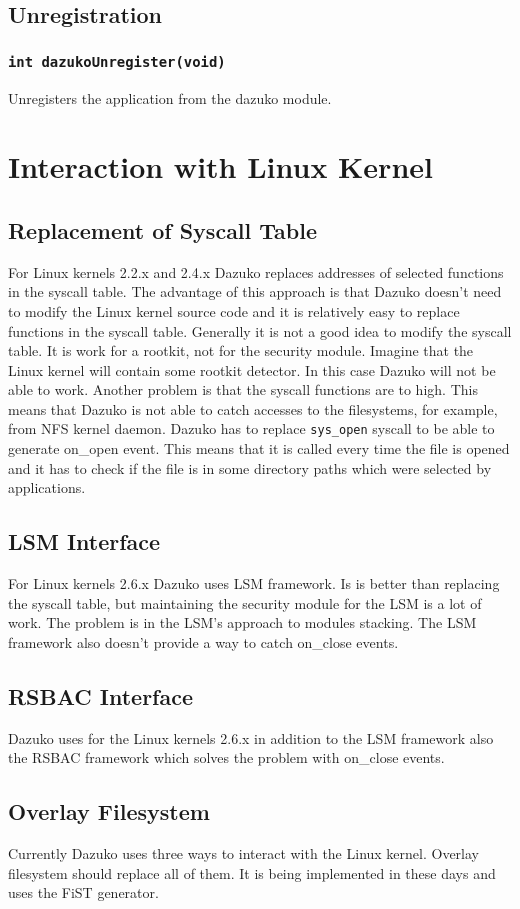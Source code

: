 \subsection*{Unregistration}
\subsubsection{\texttt{int dazukoUnregister(void)}}
Unregisters the application from the dazuko module.


\section{Interaction with Linux Kernel}

\subsection{Replacement of Syscall Table}
For Linux kernels 2.2.x and 2.4.x Dazuko replaces addresses of selected functions in
the syscall table. The advantage of this approach is that Dazuko doesn't need to modify
the Linux kernel source code and it is relatively easy to replace functions in the syscall
table. Generally it is not a good idea to modify the syscall table. It is work
for a 
rootkit, not for the security module. Imagine that the Linux kernel will contain some rootkit
detector. In this case Dazuko will not be able to work. Another problem is that
the syscall
functions are to high. This means that Dazuko is not able to catch accesses to the
filesystems, for example, from NFS kernel daemon. Dazuko has to replace
\texttt{sys\_open} syscall to be able to generate on\_open event. This means that
it is called every time the file is opened and it has to check if the file is in some
directory paths which were selected by applications.

\subsection{LSM Interface}
For Linux kernels 2.6.x Dazuko uses LSM framework. Is is better than replacing
the syscall
table, but maintaining the security module for the LSM is a lot of work. The
problem is in the LSM's
approach to modules stacking. The LSM framework also doesn't provide a way to catch
on\_close events.

\subsection{RSBAC Interface}
Dazuko uses for the Linux kernels 2.6.x in addition to the LSM framework also
the RSBAC framework which solves the problem with on\_close events.

\subsection{Overlay Filesystem}
Currently Dazuko uses three ways to interact with the Linux kernel. Overlay
filesystem should replace all of them. It is being implemented in these days and
uses the FiST generator.
